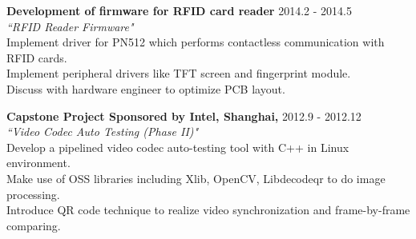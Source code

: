 \documentclass{res}
\begin{document}
\begin{resume}
   {\bf Development of firmware for RFID card reader} {\hfill 2014.2 - 2014.5\\}
   \emph {``RFID Reader Firmware"}\\
Implement driver for PN512 which performs contactless communication with RFID cards.\\
Implement peripheral drivers like TFT screen and fingerprint module.\\
Discuss with hardware engineer to optimize PCB layout.

   {\bf Capstone Project Sponsored by Intel, Shanghai,} {\hfill 2012.9 - 2012.12\\}
   \emph {``Video Codec Auto Testing (Phase II)"}\\
Develop a pipelined video codec auto-testing tool with C++ in Linux environment.\\
Make use of OSS libraries including Xlib, OpenCV, Libdecodeqr to do image processing.\\
Introduce QR code technique to realize video synchronization and frame-by-frame comparing.
%




\end{resume}
\end{document}
